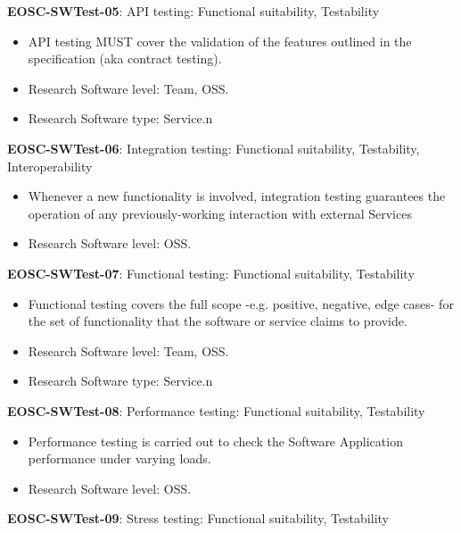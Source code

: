 \textbf{EOSC-SWTest-05}: API testing: Functional suitability, Testability

\begin{itemize}
    \item API testing MUST cover the validation of the features outlined in the specification (aka contract testing). \cite{orviz_fernandez_eosc-synergy_2020}
    \item Research Software level: Team, OSS.
    \item Research Software type: Service.n\end{itemize}

\textbf{EOSC-SWTest-06}: Integration testing: Functional suitability, Testability, Interoperability

\begin{itemize}
    \item Whenever a new functionality is involved, integration testing guarantees the operation of any previously-working interaction with external Services \cite{iso_25010_2011_2017,orviz_fernandez_eosc-synergy_2020}
    \item Research Software level: OSS.
\end{itemize}

\textbf{EOSC-SWTest-07}: Functional testing: Functional suitability, Testability

\begin{itemize}
    \item Functional testing covers the full scope -e.g. positive, negative, edge cases- for the set of functionality that the software or service claims to provide. \cite{iso_25010_2011_2017,orviz_fernandez_eosc-synergy_2020}
    \item Research Software level: Team, OSS.
    \item Research Software type: Service.n\end{itemize}

\textbf{EOSC-SWTest-08}: Performance testing: Functional suitability, Testability

\begin{itemize}
    \item Performance testing is carried out to check the Software Application performance under varying loads. \cite{iso_25010_2011_2017,orviz_fernandez_eosc-synergy_2020}
    \item Research Software level: OSS.
\end{itemize}

\textbf{EOSC-SWTest-09}: Stress testing: Functional suitability, Testability

